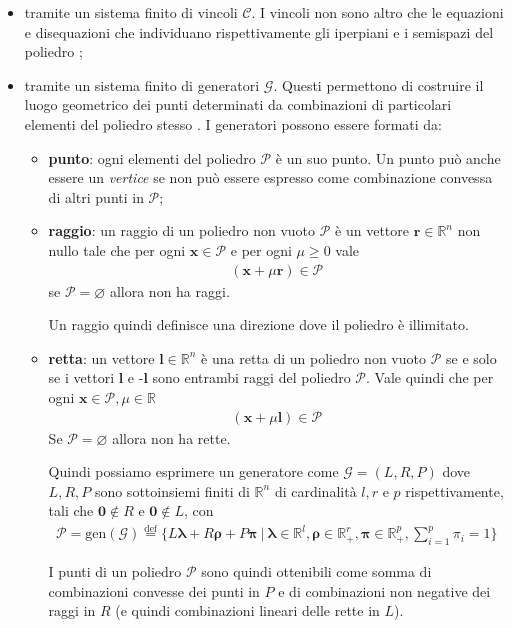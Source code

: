 \documentclass{mimosis}
\theoremstyle{definition}
\let\emptyset\varnothing
\begin{document}
\begin{itemize}
\item tramite un sistema finito di vincoli \(\mathcal{C}\). I vincoli
non sono altro che le equazioni e disequazioni che individuano rispettivamente
gli iperpiani e i semispazi del poliedro \cite{Becchi17th};
\item tramite un sistema finito di generatori \(\mathcal{G}\). Questi
permettono di costruire il luogo geometrico dei punti determinati da
combinazioni di particolari elementi del poliedro stesso \cite{Becchi17th}. I
generatori possono essere formati da:
\begin{itemize}
\item \textbf{punto}: ogni elementi del poliedro \(\mathcal{P}\) è un suo punto. Un punto
può anche essere un \emph{vertice} se non può essere espresso come combinazione
convessa di altri punti in \(\mathcal{P}\);
\item \textbf{raggio}: un raggio di un poliedro non vuoto \(\mathcal{P}\) è un vettore
\(\bm{r} \in \mathbb{R}^n\) non nullo tale che per ogni \(\bm{x} \in
    \mathcal{P}\) e per ogni \(\mu \ge 0\) vale
\begin{align*}
(\bm{x} + \mu \bm{r}) \in \mathcal{P}
\end{align*}
se \(\mathcal{P} = \emptyset\) allora non ha raggi.

Un raggio quindi definisce una direzione dove il poliedro è illimitato.
\item \textbf{retta}: un vettore \(\bm{l} \in \mathbb{R}^n\) è una retta di un poliedro non
vuoto \(\mathcal{P}\) se e solo se i vettori \(\bm{l}\) e -\(\bm{l}\) sono
entrambi raggi del poliedro \(\mathcal{P}\). Vale quindi che per ogni \(\bm{x}
    \in \mathcal{P}, \mu \in \mathbb{R}\)
\begin{align*}
(\bm{x} + \mu\bm{l}) \in \mathcal{P}
\end{align*}
Se \(\mathcal{P} = \emptyset\) allora non ha rette.

Quindi possiamo esprimere un generatore come \(\mathcal{G} =
    (\mathit{L},\mathit{R},\mathit{P})\) dove \(\mathit{L},\mathit{R},\mathit{P}\)
sono sottoinsiemi finiti di \(\mathbb{R}^n\) di cardinalità \(l,r\) e \(p\)
rispettivamente, tali che \(\bm{0} \notin \mathit{R}\) e \(\bm{0} \notin \mathit{L}\), con
\begin{align*}
\mathcal{P} = \text{gen}(\mathcal{G}) \stackrel{\text{def}}{=} \{\mathit{L}\bm{\lambda} + \mathit{R}\bm{\rho} + \mathit{P}\bm{\pi} \: | \:
\bm{\lambda} \in \mathbb{R}^l, \bm{\rho} \in \mathbb{R}^r_+, \bm{\pi} \in \mathbb{R}^p_+, \sum\limits_{i=1}^p \pi_i = 1\}
\end{align*}

I punti di un poliedro \(\mathcal{P}\) sono quindi ottenibili come somma di combinazioni
convesse dei punti in \(\mathit{P}\) e di combinazioni non negative
dei raggi in \(\mathit{R}\) (e quindi combinazioni lineari delle rette in \(\mathit{L}\)).
\end{itemize}
\end{itemize}
\end{document}
